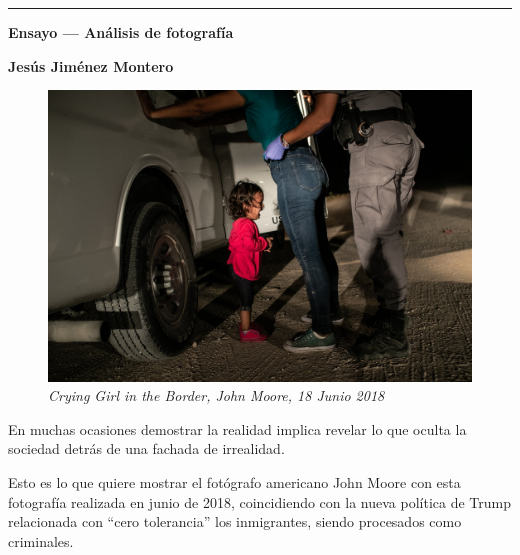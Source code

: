 \documentclass[11pt,a4paper]{article}
\begin{document}
\begin{titlepage}

    \centering
    \hrule
    \vspace{1cm}
    {\bfseries\Huge Ensayo --- Análisis de fotografía \par}
    \vspace{0.5cm}
    \large{\textbf{Jesús Jiménez Montero} \par}

    \vspace{1cm}
    
    \begin{figure}[H]

        \includegraphics[width=\textwidth,height=\textheight,keepaspectratio]{Images/WPPF-2019PhotoContest-POYNominee-JohnMoore.jpg}
        \caption{\small{\textit{Crying Girl in the Border, John Moore, 18 Junio 2018}}}
        \label{fig:foto}

    \end{figure}
    
    \vspace{0.5cm}


    \vspace{1cm}
    \hrulefill

\end{titlepage}
\newpage

En muchas ocasiones demostrar la realidad implica revelar lo que oculta la sociedad detrás de una fachada de irrealidad. 

Esto es lo que quiere mostrar el fotógrafo americano John Moore con esta fotografía realizada en junio de 2018, coincidiendo con la nueva política de Trump relacionada con “cero tolerancia” los inmigrantes, siendo procesados como criminales. 
\end{document}
